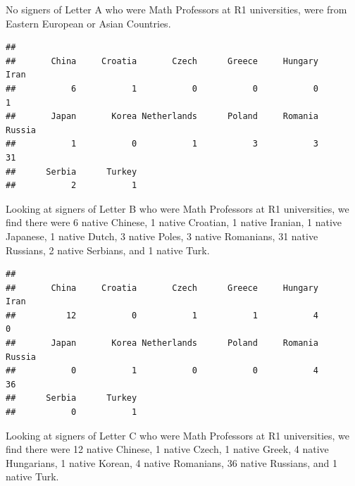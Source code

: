 \documentclass[]{article}
\newenvironment{Shaded}{\begin{snugshade}}{\end{snugshade}}
\newcommand{\KeywordTok}[1]{\textcolor[rgb]{0.13,0.29,0.53}{\textbf{#1}}}
\newcommand{\NormalTok}[1]{#1}
\newcommand{\OperatorTok}[1]{\textcolor[rgb]{0.81,0.36,0.00}{\textbf{#1}}}
\newcommand{\StringTok}[1]{\textcolor[rgb]{0.31,0.60,0.02}{#1}}
\begin{document}
No signers of Letter A who were Math Professors at R1 universities, were
from Eastern European or Asian Countries.

\begin{Shaded}
\end{Shaded}

\begin{verbatim}
## 
##       China     Croatia       Czech      Greece     Hungary        Iran 
##           6           1           0           0           0           1 
##       Japan       Korea Netherlands      Poland     Romania      Russia 
##           1           0           1           3           3          31 
##      Serbia      Turkey 
##           2           1
\end{verbatim}

Looking at signers of Letter B who were Math Professors at R1
universities, we find there were 6 native Chinese, 1 native Croatian, 1
native Iranian, 1 native Japanese, 1 native Dutch, 3 native Poles, 3
native Romanians, 31 native Russians, 2 native Serbians, and 1 native
Turk.

\begin{Shaded}
\end{Shaded}

\begin{verbatim}
## 
##       China     Croatia       Czech      Greece     Hungary        Iran 
##          12           0           1           1           4           0 
##       Japan       Korea Netherlands      Poland     Romania      Russia 
##           0           1           0           0           4          36 
##      Serbia      Turkey 
##           0           1
\end{verbatim}

Looking at signers of Letter C who were Math Professors at R1
universities, we find there were 12 native Chinese, 1 native Czech, 1
native Greek, 4 native Hungarians, 1 native Korean, 4 native Romanians,
36 native Russians, and 1 native Turk.
\end{document}

